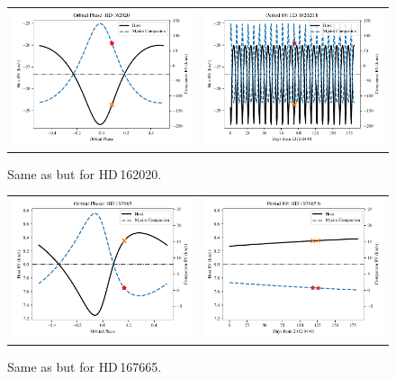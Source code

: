 \begin{figure}
    \centering
    \begin{tabular}{cc}
        \includegraphics[width=0.45\linewidth]{figures/direct-recovery/orbital-plots/HD162020_orbital_phase.pdf}&
        \includegraphics[width=0.45\linewidth]{figures/direct-recovery/orbital-plots/HD162020_p89.pdf}\\
    \end{tabular}
    \caption{Same as  but for {HD\,162020}.}
    \label{fig:hd162020p89}
\end{figure}

\begin{figure}
    \centering
    \begin{tabular}{cc}
        \includegraphics[width=0.45\linewidth]{figures/direct-recovery/orbital-plots/HD167665_orbital_phase.pdf}&
        \includegraphics[width=0.45\linewidth]{figures/direct-recovery/orbital-plots/HD167665_p89.pdf}\\
    \end{tabular}
    \caption{Same as  but for {HD\,167665}.}
    \label{fig:hd167665p89}
\end{figure}

